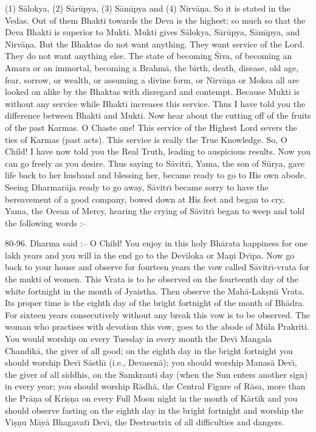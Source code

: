 (1) S\=alokya, (2) S\=ar\=upya, (3) S\=am\={\i}pya and (4) Nirv\=a\d{n}a. So it is stated in the Vedas. Out of them Bhakti towards the Deva is the highest; so much so that the Deva Bhakti is superior to Mukti. Mukti gives S\=alokya, S\=ar\=upya, S\=am\={\i}pya, and Nirv\=a\d{n}a. But the Bhaktas do not want anything. They want service of the Lord. They do not want anything else. The state of becoming \'Siva, of becoming an Amara or an immortal, becoming a Brahm\=a, the birth, death, disease, old age, fear, sorrow, or wealth, or assuming a divine form, or Nirv\=a\d{n}a or Moksa all are looked on alike by the Bhaktas with disregard and contempt. Because Mukti is without any service while Bhakti increases this service. Thus I have told you the difference between Bhakti and Mukti. Now hear about the cutting off of the fruits of the past Karmas. O Chaste one! This service of the Highest Lord severs the ties of Karmas (past acts). This service is really the True Knowledge. So, O Child! I have now told you the Real Truth, leading to auspicious results. Now you can go freely as you desire. Thus saying to S\=avitr\={\i}, Yama, the son of S\=urya, gave life back to her husband and blessing her, became ready to go to His own abode. Seeing Dharmar\=aja ready to go away, S\=avitr\={\i} became sorry to have the bereavement of a good company, bowed down at His feet and began to cry. Yama, the Ocean of Mercy, hearing the crying of S\=avitr\={\i} began to weep and told the following words :--

80-96. Dharma said :-- O Child! You enjoy in this holy Bh\=arata happiness for one lakh years and you will in the end go to the Dev\={\i}loka or Ma\d{n}i Dv\={\i}pa. Now go back to your house and observe for fourteen years the vow called S\=avitr\={\i}-vrata for the mukti of women. This Vrata is to he observed on the fourteenth day of the white fortnight in the month of Jyaistha. Then observe the Mah\=a-Lak\d{s}m\={\i} Vrata. Its proper time is the eighth day of the bright fortnight of the month of Bh\=adra. For sixteen years consecutively without any break this vow is to be observed. The woman who practises with devotion this vow, goes to the abode of M\=ula Prakriti. You would worship on every Tuesday in every month the Dev\={\i} Mangala Chandik\=a, the giver of all good; on the eighth day in the bright fortnight you should worship Dev\={\i} S\=asth\={\i} (i.e., Devasen\=a); you should worship Manas\=a Dev\={\i}, the giver of all siddhis, on the Samkranti day (when the Sun enters another sign) in every year; you should worship R\=adh\=a, the Central Figure of R\=asa, more than the Pr\=a\d{n}a of Kri\d{s}\d{n}a on every Full Moon night in the month of K\=artik and you should observe fasting on the eighth day in the bright fortnight and worship the Vi\d{s}\d{n}u M\=ay\=a Bhagavat\={\i} Dev\={\i}, the Destructrix of all difficulties and dangers.

